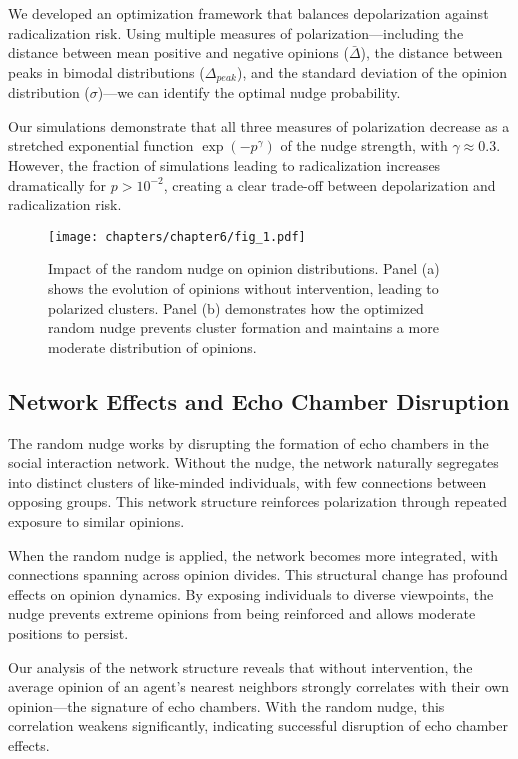 We developed an optimization framework that balances depolarization against radicalization risk. Using multiple measures of polarization—including the distance between mean positive and negative opinions ($\bar{\Delta}$), the distance between peaks in bimodal distributions ($\Delta_{peak}$), and the standard deviation of the opinion distribution ($\sigma$)—we can identify the optimal nudge probability.

Our simulations demonstrate that all three measures of polarization decrease as a stretched exponential function $\exp(-p^\gamma)$ of the nudge strength, with $\gamma \approx 0.3$. However, the fraction of simulations leading to radicalization increases dramatically for $p > 10^{-2}$, creating a clear trade-off between depolarization and radicalization risk.

\begin{figure}[h]
    \centering
    \texttt{[image: chapters/chapter6/fig\_1.pdf]}
    \caption{Impact of the random nudge on opinion distributions. Panel (a) shows the evolution of opinions without intervention, leading to polarized clusters. Panel (b) demonstrates how the optimized random nudge prevents cluster formation and maintains a more moderate distribution of opinions.}
    \label{fig:randnudge}
\end{figure}

\subsection{Network Effects and Echo Chamber Disruption}

The random nudge works by disrupting the formation of echo chambers in the social interaction network. Without the nudge, the network naturally segregates into distinct clusters of like-minded individuals, with few connections between opposing groups. This network structure reinforces polarization through repeated exposure to similar opinions.

When the random nudge is applied, the network becomes more integrated, with connections spanning across opinion divides. This structural change has profound effects on opinion dynamics. By exposing individuals to diverse viewpoints, the nudge prevents extreme opinions from being reinforced and allows moderate positions to persist.

Our analysis of the network structure reveals that without intervention, the average opinion of an agent's nearest neighbors strongly correlates with their own opinion—the signature of echo chambers. With the random nudge, this correlation weakens significantly, indicating successful disruption of echo chamber effects.

